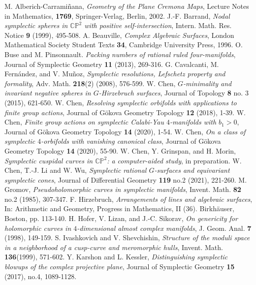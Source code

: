 \documentclass[11pt]{amsart}
\theoremstyle{plain}
\numberwithin{theorem}{section}
\theoremstyle{definition}
\newcommand{\C}{{\mathbb C}}
\renewcommand{\P}{{\mathbb P}}
\begin{document}
 
\begin{thebibliography}{}
 M. Alberich-Carrami\~{n}ana, {\em Geometry of the Plane Cremona Maps}, Lecture Notes in Mathematics, {\bf 1769}, Springer-Verlag, Berlin, 2002. 
 J.-F. Barrand, {\em Nodal symplectic spheres in $\C\P^2$ with positive 
self-intersection}, Intern. Math. Res. Notice {\bf 9} (1999), 495-508. 
 A. Beauville, {\em Complex Algebraic Surfaces}, London Mathematical Society Student Texts {\bf 34}, Cambridge University Press, 1996.
 O. Buse and M. Pinsonnault. {\em Packing numbers of rational ruled four-manifolds}, 
Journal of Symplectic Geometry {\bf 11} (2013), 269-316.
 G. Cavalcanti, M. Fern\'{a}ndez, and V. Mu\~{n}oz, {\em Symplectic resolutions, Lefschetz property and formality}, Adv. Math. {\bf 218}(2) (2008), 576-599. 
 W. Chen, {\em $G$-minimality and invariant negative spheres in $G$-Hirzebruch 
surfaces}, Journal of Topology {\bf 8} no. 3 (2015), 621-650.
 W. Chen, {\em Resolving symplectic orbifolds with applications to finite group actions},
Journal of G\"{o}kova Geometry Topology {\bf 12} (2018), 1-39.
 W. Chen, {\em Finite group actions on symplectic Calabi-Yau $4$-manifolds with $b_1>0$}, Journal of G\"{o}kova Geometry Topology {\bf 14} (2020), 1-54. 
 W. Chen, {\em On a class of symplectic $4$-orbifolds with vanishing canonical class}, Journal of G\"{o}kova Geometry Topology {\bf 14} (2020), 55-90.
 W. Chen, Y. Grinspan, and H. Morin, {\em Symplectic cuspidal curves in $\C\P^2$: a computer-aided study}, in preparation. 
 W. Chen, T.-J. Li and W. Wu, {\em Symplectic rational $G$-surfaces and equivariant symplectic cones}, Journal of Differential Geometry {\bf 119} no.2 (2021), 221-260.
 M. Gromov, {\em Pseudoholomorphic curves in symplectic manifolds}, Invent. Math. {\bf 82} no.2 (1985), 307-347. 
 F. Hirzebruch, {\em Arrangements of lines and algebraic surfaces}, In: Arithmetic and Geometry, Progress in Mathematics, II (36). Birkhäuser, Boston, pp. 113-140. 
 H. Hofer, V. Lizan, and J.-C. Sikorav, {\em On genericity for holomorphic 
curves in $4$-dimensional almost complex manifolds}, J. Geom. Anal. {\bf 7} (1998), 149-159. 
 S. Ivashkovich and V. Shevchishin, {\em Structure of the moduli space in a 
neighborhood of a cusp-curve and meromorphic hulls}, Invent. Math. {\bf 136}(1999), 571-602. 
 Y. Karshon and L. Kessler, {\em Distinguishing symplectic blowups of the complex projective plane}, Journal of Symplectic Geometry {\bf 15} (2017), no.4, 1089-1128.

\end{thebibliography}
\end{document}
